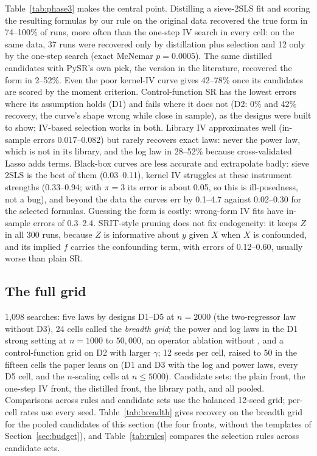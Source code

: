 Table~\ref{tab:phase3} makes the central point. Distilling a sieve-2SLS fit and scoring the resulting formulas by our rule on the original data recovered the true form in 74--100\% of runs, more often than the one-step IV search in every cell: on the same data, 37 runs were recovered only by distillation plus selection and 12 only by the one-step search (exact McNemar $p = 0.0005$). The same distilled candidates with PySR's own pick, the version in the literature, recovered the form in 2--52\%. Even the poor kernel-IV curve gives 42--78\% once its candidates are scored by the moment criterion. Control-function SR has the lowest errors where its assumption holds (D1) and fails where it does not (D2: 0\% and 42\% recovery, the curve's shape wrong while close in sample), as the designs were built to show; IV-based selection works in both. Library IV approximates well (in-sample errors 0.017--0.082) but rarely recovers exact laws: never the power law, which is not in its library, and the log law in 28--52\% because cross-validated Lasso adds terms. Black-box curves are less accurate and extrapolate badly: sieve 2SLS is the best of them (0.03--0.11), kernel IV struggles at these instrument strengths (0.33--0.94; with $\pi = 3$ its error is about 0.05, so this is ill-posedness, not a bug), and beyond the data the curves err by 0.1--4.7 against 0.02--0.30 for the selected formulas. Guessing the form is costly: wrong-form IV fits have in-sample errors of 0.3--2.4. SRIT-style pruning does not fix endogeneity: it keeps $Z$ in all 300 runs, because $Z$ is informative about $y$ given $X$ when $X$ is confounded, and its implied $f$ carries the confounding term, with errors of 0.12--0.60, usually worse than plain SR.

\subsection{The full grid}
\label{sec:mc-grid}

1{,}098 searches: five laws by designs D1--D5 at $n = 2000$ (the two-regressor law without D3), 24 cells called the \emph{breadth grid}; the power and log laws in the D1 strong setting at $n = 1000$ to $50{,}000$, an operator ablation without , and a control-function grid on D2 with larger $\gamma$; 12 seeds per cell, raised to 50 in the fifteen cells the paper leans on (D1 and D3 with the log and power laws, every D5 cell, and the $n$-scaling cells at $n \le 5000$). Candidate sets: the plain front, the one-step IV front, the distilled front, the library path, and all pooled. Comparisons across rules and candidate sets use the balanced 12-seed grid; per-cell rates use every seed. Table~\ref{tab:breadth} gives recovery on the breadth grid for the pooled candidates of this section (the four fronts, without the templates of Section~\ref{sec:budget}), and Table~\ref{tab:rules} compares the selection rules across candidate sets.

